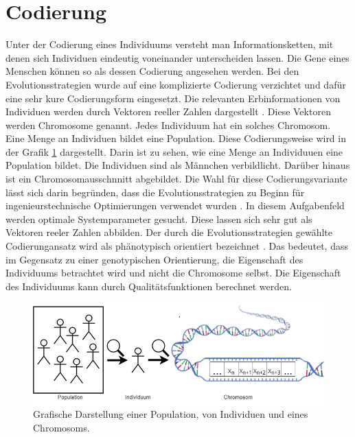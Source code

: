 \section{Codierung}
Unter der Codierung eines Individuums versteht man Informationsketten, mit denen sich Individuen eindeutig voneinander unterscheiden lassen.
Die Gene eines Menschen können so als dessen Codierung angesehen werden.
Bei den Evolutionsstrategien wurde auf eine komplizierte Codierung verzichtet und dafür eine sehr kure Codierungsform eingesetzt. Die relevanten Erbinformationen von Individuen werden durch Vektoren reeller Zahlen dargestellt \cite{}. Diese Vektoren werden Chromosome genannt. Jedes Individuum hat ein solches Chromosom.
Eine Menge an Individuen bildet eine Population. Diese Codierungsweise wird in der Grafik \ref{fig:codierung} dargestellt. Darin ist zu sehen, wie eine Menge an Individuuen eine Population bildet. Die Individuen sind als Männchen verbildlicht. Darüber hinaus ist ein Chromosomausschnnitt abgebildet.
Die Wahl für diese Codierungsvariante lässt sich darin begründen, dass die Evolutionsstrategien zu Beginn für ingenieurstechnische Optimierungen verwendet wurden \cite{}.
In diesem Aufgabenfeld werden optimale Systemparameter gesucht. Diese lassen sich sehr gut als Vektoren reeler Zahlen abbilden.
Der durch die Evolutionsstrategien gewählte Codierungansatz wird als phänotypisch orientiert bezeichnet \cite{}. Das bedeutet, dass im Gegensatz zu einer genotypischen Orientierung, die Eigenschaft des Individuums betrachtet wird und nicht die Chromosome selbst.
Die Eigenschaft des Individuums kann durch Qualitätsfunktionen berechnet werden.

\begin{figure}[!htb]
	\centering
	\includegraphics[width=1.\textwidth]{img/codierung/codierung.png}
	\caption{Grafische Darstellung einer Population, von Individuen und eines Chromosoms.}
\label{fig:codierung}
\end{figure}



